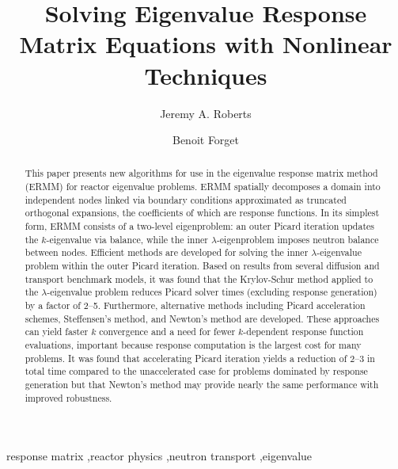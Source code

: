 \documentclass[preprint, 11pt]{elsarticle}
\begin{document}
\begin{frontmatter}

\title{Solving Eigenvalue Response Matrix Equations with 
       Nonlinear Techniques}


\author[label1]{Jeremy A. Roberts}
\author[label2]{Benoit Forget}
\address[label1]{Department of Mechanical and Nuclear Engineering,
                 Kansas State University, 3002 Rathbone Hall, Manhattan, KS 66506, USA}
\address[label2]{Department of Nuclear Science and Engineering, 
                 Massachusetts Institute of Technology,
                 77 Massachusetts Avenue, 24-107, Cambridge, MA 02139, USA}

\begin{abstract}

This paper presents new algorithms for use in 
the eigenvalue response matrix method (ERMM) for reactor 
eigenvalue problems.  ERMM spatially decomposes a
 domain into independent nodes linked via
 boundary conditions approximated as 
truncated orthogonal expansions, the coefficients of which are  
response functions. 
In its simplest form, ERMM consists of a two-level 
eigenproblem: an outer Picard iteration updates the $k$-eigenvalue 
via balance,
while the inner $\lambda$-eigenproblem imposes neutron balance between nodes.  
Efficient methods are developed for solving the inner $\lambda$-eigenvalue 
problem within the outer Picard iteration. 
 Based on results from  
several diffusion and transport benchmark models, it was found that 
the Krylov-Schur method 
applied to the $\lambda$-eigenvalue problem reduces Picard solver 
times (excluding response generation) by a factor of 2--5. 
Furthermore, alternative methods including Picard acceleration schemes, Steffensen's 
method, and Newton's method are developed.  These approaches can 
yield faster $k$ convergence and a need for fewer
 $k$-dependent response function evaluations,
important because response computation is the 
largest cost for many problems.  It was found that
accelerating Picard iteration yields a reduction of 2--3 in total time 
compared to the unaccelerated case
for problems dominated by response generation but that 
Newton's method may provide nearly the same performance with improved 
robustness.
\end{abstract}

\begin{keyword}

response matrix \sep reactor physics \sep neutron transport \sep eigenvalue
\end{keyword}

\end{frontmatter}






%
\end{document}
